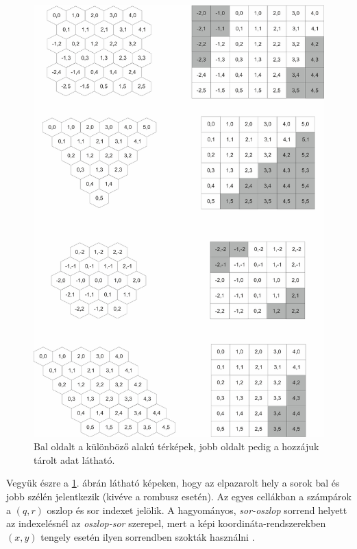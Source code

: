 \begin{figure}[h!]
\centering
\includegraphics[scale=0.235]{kepek/StorageProblem.jpg}
\caption{Bal oldalt a különböző alakú térképek, jobb oldalt pedig a hozzájuk tárolt adat látható.}
\label{fig:StorageProblem}
\end{figure}

\noindent Vegyük észre a \ref{fig:StorageProblem}. ábrán látható képeken, hogy az elpazarolt hely a sorok bal és jobb szélén jelentkezik (kivéve a rombusz esetén). Az egyes cellákban a számpárok a $(q, r)$ oszlop és sor indexet jelölik. A hagyományos, \textit{sor-oszlop} sorrend helyett az indexelésnél az \textit{oszlop-sor} szerepel, mert a képi koordináta-rendszerekben $(x, y)$ tengely esetén ilyen sorrendben szokták használni \cite{Storage}.


